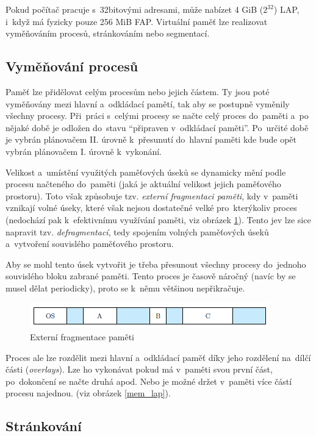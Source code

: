 Pokud počítač pracuje s~32bitovými adresami, může nabízet 4 GiB ($2^{32}$) LAP, i~když má fyzicky pouze 256 MiB FAP. Virtuální paměť lze realizovat vyměňováním procesů, stránkováním nebo segmentací.

\subsection{Vyměňování procesů}

Paměť lze přidělovat celým procesům nebo jejich částem. Ty jsou poté vyměňovány mezi hlavní a~odkládací pamětí, tak aby se postupně vyměnily všechny procesy. Při~práci s~celými procesy se načte celý proces do~paměti a~po nějaké době je odložen do~stavu \enquote{připraven v~odkládací paměti}. Po~určité době je vybrán plánovačem II. úrovně k~přesunutí do~hlavní paměti kde bude opět vybrán plánovačem I. úrovně k~vykonání.

Velikost a~umístění využitých paměťových úseků se dynamicky mění podle procesu načteného do~paměti (jaká je aktuální velikost jejich paměťového prostoru). Toto však způsobuje tzv. \emph{externí fragmentaci paměti}, kdy v~paměti vznikají volné úseky, které však nejsou dostatečné velké pro~kterýkoliv proces (nedochází pak k~efektivnímu využívání paměti, viz obrázek \ref{mem_fragmentace}). Tento jev lze sice napravit tzv. \emph{defragmentací}, tedy spojením volných paměťových úseků a~vytvoření souvislého paměťového prostoru.

Aby se mohl tento úsek vytvořit je třeba přesunout všechny procesy do~jednoho souvislého bloku zabrané paměti. Tento proces je časově náročný (navíc by se musel dělat periodicky), proto se k~němu většinou nepřikračuje.

\begin{figure}[ht]
	\centering
	\includegraphics[scale=1]{images/mem_fragmentace.png}
	\caption{Externí fragmentace paměti}
	\label{mem_fragmentace}
\end{figure}

Proces ale lze rozdělit mezi hlavní a~odkládací paměť díky jeho rozdělení na~dílčí části (\emph{overlays}). Lze ho vykonávat pokud má v~paměti svou první část, po~dokončení se načte druhá apod. Nebo je možné držet v~paměti více částí procesu najednou. (viz obrázek \ref{mem_lap}).

\subsection{Stránkování}


